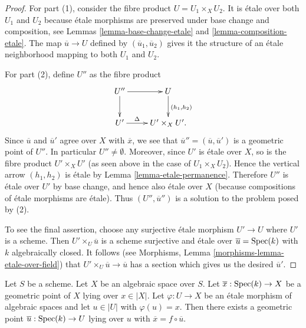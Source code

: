 \begin{proof}
For part (1), consider the fibre product $U = U_1 \times_X U_2$.
It is \'etale over both $U_1$ and $U_2$ because \'etale morphisms are
preserved under base change and composition, see
Lemmas \ref{lemma-base-change-etale} and \ref{lemma-composition-etale}.
The map $\overline{u} \to U$ defined by $(\overline{u}_1, \overline{u}_2)$
gives it the structure of an \'etale neighborhood mapping to both
$U_1$ and $U_2$.

\medskip\noindent
For part (2), define $U''$ as the fibre product
$$
\xymatrix{
U'' \ar[r] \ar[d] & U \ar^{(h_1, h_2)}[d] \\
U' \ar^-\Delta[r] & U' \times_X U'.
}
$$
Since $\overline{u}$ and $\overline{u}'$ agree over $X$ with $\overline{x}$,
we see that $\overline{u}'' = (\overline{u}, \overline{u}')$ is a geometric
point of $U''$. In particular $U'' \not = \emptyset$.
Moreover, since $U'$ is \'etale over $X$, so is the fibre product
$U'\times_X U'$ (as seen above in the case of $U_1 \times_X U_2$).
Hence the vertical arrow $(h_1, h_2)$ is \'etale by
Lemma \ref{lemma-etale-permanence}.
Therefore $U''$ is \'etale over $U'$ by base change, and hence also
\'etale over $X$ (because compositions of \'etale morphisms are \'etale).
Thus $(U'', \overline{u}'')$ is a solution to the problem posed by (2).

\medskip\noindent
To see the final assertion, choose any surjective \'etale morphism
$U' \to U$ where $U'$ is a scheme. Then
$U' \times_U \overline{u}$ is a scheme surjective and \'etale over
$\overline{u} = \mathop{\rm Spec}(k)$ with $k$ algebraically closed.
It follows (see
Morphisms, Lemma \ref{morphisms-lemma-etale-over-field})
that $U' \times_U \overline{u} \to \overline{u}$ has a section
which gives us the desired $\overline{u}'$.
\end{proof}

\begin{lemma}
\label{lemma-geometric-lift-to-usual}
Let $S$ be a scheme. Let $X$ be an algebraic space over $S$.
Let $\overline{x} : \mathop{\rm Spec}(k) \to X$ be a geometric point of $X$
lying over $x \in |X|$. Let $\varphi : U \to X$ be an \'etale morphism
of algebraic spaces and let $u \in |U|$ with $\varphi(u) = x$.
Then there exists a geometric point
$\overline{u} : \mathop{\rm Spec}(k) \to U$ lying over $u$ with
$\overline{x} = f \circ \overline{u}$.
\end{lemma}

